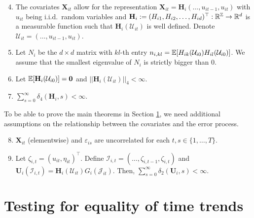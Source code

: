 \documentclass[a4paper,12pt]{article}
\begin{document}
\begin{enumerate}[label=(C\arabic*),leftmargin=1.05cm]
\setcounter{enumi}{3}

\item \label{C-reg1} The covariates $ \mathbf{X}_{it}$ allow for the representation $ \mathbf{X}_{it} = \mathbf{H}_i(\ldots,u_{it-1},u_{it})$ with $u_{it}$ being i.i.d.\ random variables and $\mathbf{H}_i := (H_{i1}, H_{i2}, \ldots, H_{id})^\top: \mathbb{R}^{\mathbb{Z}} \rightarrow \mathbb{R}^d$ is a measurable function such that $\mathbf{H}_i(\mathcal{U}_{it})$ is well defined. Denote $\mathcal{U}_{it} = (\ldots, u_{it-1}, u_{it})$.

\item \label{C-reg2} Let $N_i$ be the $d\times d$ matrix with $kl$-th entry $n_{i, kl}= \mathbb{E}[H_{ik}(\mathcal{U}_{i0})H_{il}(\mathcal{U}_{i0})]$. We assume that the smallest eigenvalue of $N_i$ is strictly bigger than $0$.

\item \label{C-reg3} Let $\mathbb{E} [\mathbf{H}_{i}(\mathcal{U}_{i0})]=\mathbf{0}$ and $||\mathbf{H}_{i}(\mathcal{U}_{it})||_4 <\infty$.
\item \label{C-reg4} $\sum_{s=0}^\infty \delta_4(\mathbf{H}_i, s)<\infty$.
\end{enumerate}

To be able to prove the main theorems in Section \ref{sec-test}, we need additional assumptions on the relationship between the covariates and the error process.

\begin{enumerate}[label=(C\arabic*),leftmargin=1.05cm]
\setcounter{enumi}{7}
\item \label{C-reg5} $\mathbf{X}_{it}$ (elementwise) and $\varepsilon_{is}$ are uncorrelated for each $t, s\in \{1, \ldots, T\}$.
\item \label{C-reg6} Let $\zeta_{i, t} = (u_{it}, \eta_{it})^\top$. Define $\mathcal{I}_{i, t} = (\ldots, \zeta_{i, t-1}, \zeta_{i, t})$ and $\mathbf{U}_i(\mathcal{I}_{i, t}) =  \mathbf{H}_i(\mathcal{U}_{it})G_i(\mathcal{J}_{it})$. Then, $\sum_{s=0}^\infty \delta_2(\mathbf{U}_i, s)<\infty$.

\end{enumerate}



\section{Testing for equality of time trends}\label{sec-test}
\end{document}
